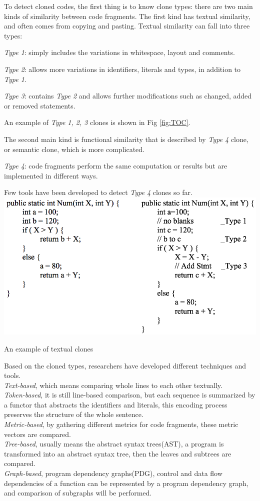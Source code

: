 \documentclass[conference]{IEEEtran}
\makeatletter
\newenvironment{figurehere}
  {\def\@captype{figure}}
  {}
\makeatother
\begin{document}
To detect cloned codes, the first thing is to know clone types: there are two main kinds of similarity between code fragments. The first kind has textual similarity, and often comes from copying and pasting. Textual similarity can fall into three types\cite{textualclone}: 

\indent \emph{Type 1}: simply includes the variations in whitespace, layout and comments.

\indent \emph{Type 2}: allows more variations in identifiers, literals and types, in addition to \emph{Type 1}.

\indent \emph{Type 3}: contains \emph{Type 2} and allows further modifications such as changed, added or removed statements. 

An example of \emph{Type 1, 2, 3} clones is shown in Fig \ref{fig:TOC}. 

The second main kind is functional similarity that is described by \emph{Type 4} clone\cite{functionclone}, or semantic clone, which is more complicated. 

\indent \emph{Type 4}: code fragments perform the same computation or results but are implemented in different ways. 

Few tools have been developed to detect \emph{Type 4} clones so far. \\

\begin{figurehere}
\centering \includegraphics[width = 0.45 \textwidth]{graph2_1} 
\caption{An example of textual clones} \label{fig:TOC}
\end{figurehere} 

Based on the cloned types, researchers have developed different techniques and tools. 
\\ \indent \emph{Text-based}, which means comparing whole lines to each other textually. 
\\ \indent \emph{Token-based}, it is still line-based comparison, but each sequence is summarized by a functor that abstracts the identifiers and literals, this encoding process preserves the structure of the whole sentence.
\\ \indent \emph{Metric-based}, by gathering different metrics for code fragments, these metric vectors are compared.
\\ \indent \emph{Tree-based}, usually means the abstract syntax trees(AST), a program is transformed into an abstract syntax tree, then the leaves and subtrees are compared.
\\ \indent \emph{Graph-based}, program dependency graphs(PDG), control and data flow dependencies of a function can be represented by a program dependency graph, and comparison of subgraphs will be performed.
\end{document}
